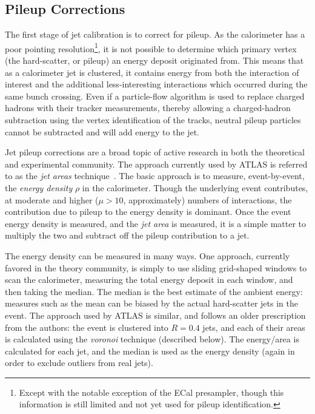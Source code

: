 \subsection{Pileup Corrections}

The first stage of jet calibration is to correct for pileup. As the calorimeter has a poor pointing resolution\footnote{Except with the notable exception of the ECal presampler, though this information is still limited and not yet used for pileup identification.}, it is not possible to determine which primary vertex (the hard-scatter, or pileup) an energy deposit originated from. This means that as a calorimeter jet is clustered, it contains energy from both the interaction of interest and the additional less-interesting interactions which occurred during the same bunch crossing. Even if a particle-flow algorithm is used to replace charged hadrons with their tracker measurements, thereby allowing a charged-hadron subtraction using the vertex identification of the tracks, neutral pileup particles cannot be subtracted and will add energy to the jet. 

Jet pileup corrections are a broad topic of active research in both the theoretical and experimental community.  The approach currently used by ATLAS is referred to as the \textit{jet areas} technique~\cite{jetareas}. The basic approach is to measure, event-by-event, the \textit{energy density} $\rho$ in the calorimeter. Though the underlying event contributes, at moderate and higher ($\mu > 10$, approximately) numbers of interactions, the contribution due to pileup to the energy density is dominant. Once the event energy density is measured, and the \textit{jet area} is measured, it is a simple matter to multiply the two and subtract off the pileup contribution to a jet.

The energy density can be measured in many ways. One approach, currently favored in the theory community, is simply to use sliding grid-shaped windows to scan the calorimeter, measuring the total energy deposit in each window, and then taking the median. The median is the best estimate of the ambient energy: measures such as the mean can be biased by the actual hard-scatter jets in the event. The approach used by ATLAS is similar, and follows an older prescription from the authors: the event is clustered into \kt $R=0.4$ jets, and each of their areas is calculated using the \textit{voronoi} technique (described below). The energy/area is calculated for each jet, and the median is used as the energy density (again in order to exclude outliers from real jets).

